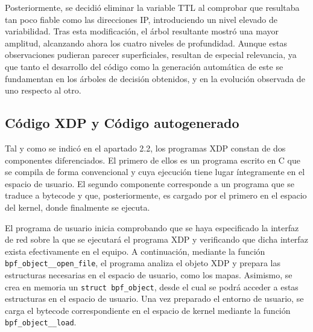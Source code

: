 Posteriormente, se decidió eliminar la variable TTL al comprobar que resultaba tan poco fiable como las direcciones IP, introduciendo un nivel elevado de variabilidad. Tras esta modificación, el árbol resultante mostró una mayor amplitud, alcanzando ahora los cuatro niveles de profundidad. Aunque estas observaciones pudieran parecer superficiales, resultan de especial relevancia, ya que tanto el desarrollo del código como la generación automática de este se fundamentan en los árboles de decisión obtenidos, y en la evolución observada de uno respecto al otro.


\subsection{Código XDP y Código autogenerado}

Tal y como se indicó en el apartado 2.2, los programas XDP constan de dos componentes diferenciados. El primero de ellos es un programa escrito en C que se compila de forma convencional y cuya ejecución tiene lugar íntegramente en el espacio de usuario. El segundo componente corresponde a un programa que se traduce a bytecode y que, posteriormente, es cargado por el primero en el espacio del kernel, donde finalmente se ejecuta.

El programa de usuario inicia comprobando que se haya especificado la interfaz de red sobre la que se ejecutará el programa XDP y verificando que dicha interfaz exista efectivamente en el equipo. A continuación, mediante la función \verb|bpf_object__open_file|, el programa analiza el objeto XDP y prepara las estructuras necesarias en el espacio de usuario, como los mapas. Asimismo, se crea en memoria un \verb|struct bpf_object|, desde el cual se podrá acceder a estas estructuras en el espacio de usuario. Una vez preparado el entorno de usuario, se carga el bytecode correspondiente en el espacio de kernel mediante la función \verb|bpf_object__load|.

